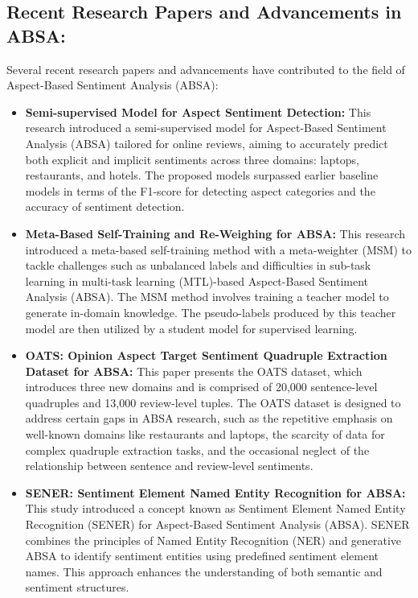 \documentclass{article}
\begin{document}
\subsection{Recent Research Papers and Advancements in ABSA: }
Several recent research papers and advancements have contributed to the field of Aspect-Based Sentiment Analysis (ABSA):

\begin{itemize}
    \item \textbf{Semi-supervised Model for Aspect Sentiment Detection: } This research introduced a semi-supervised model for Aspect-Based Sentiment Analysis (ABSA) tailored for online reviews, aiming to accurately predict both explicit and implicit sentiments across three domains: laptops, restaurants, and hotels. The proposed models surpassed earlier baseline models in terms of the F1-score for detecting aspect categories and the accuracy of sentiment detection\cite{Madhoushi2023SemiSupervisedMF}.

    \item \textbf{Meta-Based Self-Training and Re-Weighing for ABSA: } This research introduced a meta-based self-training method with a meta-weighter (MSM) to tackle challenges such as unbalanced labels and difficulties in sub-task learning in multi-task learning (MTL)-based Aspect-Based Sentiment Analysis (ABSA). The MSM method involves training a teacher model to generate in-domain knowledge. The pseudo-labels produced by this teacher model are then utilized by a student model for supervised learning\cite{He2023MetaBasedSA}.

    \item \textbf{OATS: Opinion Aspect Target Sentiment Quadruple Extraction Dataset for ABSA: } This paper presents the OATS dataset, which introduces three new domains and is comprised of 20,000 sentence-level quadruples and 13,000 review-level tuples. The OATS dataset is designed to address certain gaps in ABSA research, such as the repetitive emphasis on well-known domains like restaurants and laptops, the scarcity of data for complex quadruple extraction tasks, and the occasional neglect of the relationship between sentence and review-level sentiments\cite{chebolu2023oats}.

    \item \textbf{SENER: Sentiment Element Named Entity Recognition for ABSA: } This study introduced a concept known as Sentiment Element Named Entity Recognition (SENER) for Aspect-Based Sentiment Analysis (ABSA). SENER combines the principles of Named Entity Recognition (NER) and generative ABSA to identify sentiment entities using predefined sentiment element names. This approach enhances the understanding of both semantic and sentiment structures\cite{Lee2023SENERSE}.
\end{itemize}
\end{document}
